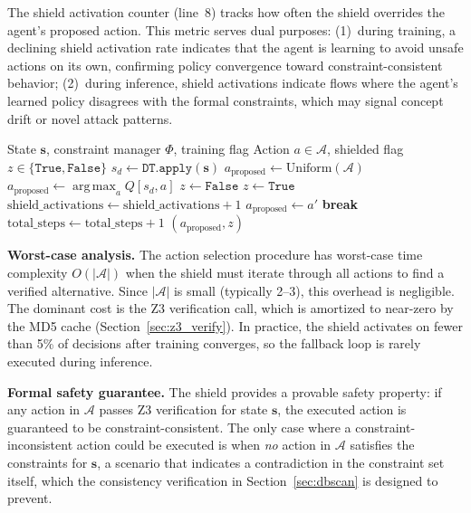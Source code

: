 \documentclass[12pt, letterpaper, oneside]{report}
\newcommand{\argmax}{\operatorname*{arg\,max}}
\newcommand{\bs}{\mathbf{s}}
\begin{document}
The shield activation counter (line~8) tracks how often the shield overrides the agent's proposed action. This metric serves dual purposes: (1)~during training, a declining shield activation rate indicates that the agent is learning to avoid unsafe actions on its own, confirming policy convergence toward constraint-consistent behavior; (2)~during inference, shield activations indicate flows where the agent's learned policy disagrees with the formal constraints, which may signal concept drift or novel attack patterns.

\begin{algorithm}[htbp]
\caption{SymbolicShieldAgent Action Selection}
\label{alg:agent_act}
\begin{algorithmic}[1]
\Require State $\bs$, constraint manager $\Phi$, training flag
\Ensure Action $a \in \mathcal{A}$, shielded flag $z \in \{\texttt{True}, \texttt{False}\}$
\State $s_d \leftarrow \texttt{DT.apply}(\bs)$ 
    \State $a_{\text{proposed}} \leftarrow \text{Uniform}(\mathcal{A})$ 
\Else
    \State $a_{\text{proposed}} \leftarrow \argmax_{a} Q[s_d, a]$ 
\EndIf
\State $z \leftarrow \texttt{False}$
\If{$\neg \texttt{verify}(\Phi, \bs, a_{\text{proposed}})$} 
    \State $z \leftarrow \texttt{True}$
    \State $\text{shield\_activations} \leftarrow \text{shield\_activations} + 1$
        \If{$\texttt{verify}(\Phi, \bs, a')$}
            \State $a_{\text{proposed}} \leftarrow a'$
            \State \textbf{break}
        \EndIf
    \EndFor
\EndIf
\State $\text{total\_steps} \leftarrow \text{total\_steps} + 1$
\State \Return $(a_{\text{proposed}}, z)$
\end{algorithmic}
\end{algorithm}

\textbf{Worst-case analysis.} The action selection procedure has worst-case time complexity $O(|\mathcal{A}|)$ when the shield must iterate through all actions to find a verified alternative. Since $|\mathcal{A}|$ is small (typically 2--3), this overhead is negligible. The dominant cost is the Z3 verification call, which is amortized to near-zero by the MD5 cache (Section~\ref{sec:z3_verify}). In practice, the shield activates on fewer than 5\% of decisions after training converges, so the fallback loop is rarely executed during inference.

\textbf{Formal safety guarantee.} The shield provides a provable safety property: if any action in $\mathcal{A}$ passes Z3 verification for state $\bs$, the executed action is guaranteed to be constraint-consistent. The only case where a constraint-inconsistent action could be executed is when \emph{no} action in $\mathcal{A}$ satisfies the constraints for $\bs$, a scenario that indicates a contradiction in the constraint set itself, which the consistency verification in Section~\ref{sec:dbscan} is designed to prevent.
\end{document}
